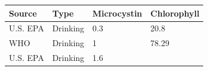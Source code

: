 \documentclass[11pt,]{article}
\begin{document}
\begin{longtable}[c]{@{}llll@{}}
\toprule
\begin{minipage}[b]{0.11\columnwidth}\raggedright\strut
Source
\strut\end{minipage} &
\begin{minipage}[b]{0.16\columnwidth}\raggedright\strut
Type
\strut\end{minipage} &
\begin{minipage}[b]{0.17\columnwidth}\raggedright\strut
Microcystin
\strut\end{minipage} &
\begin{minipage}[b]{0.17\columnwidth}\raggedright\strut
Chlorophyll
\strut\end{minipage}\tabularnewline
\midrule
\endhead
\begin{minipage}[t]{0.11\columnwidth}\raggedright\strut
U.S. EPA
\strut\end{minipage} &
\begin{minipage}[t]{0.16\columnwidth}\raggedright\strut
Drinking
\strut\end{minipage} &
\begin{minipage}[t]{0.17\columnwidth}\raggedright\strut
0.3
\strut\end{minipage} &
\begin{minipage}[t]{0.17\columnwidth}\raggedright\strut
20.8
\strut\end{minipage}\tabularnewline
\begin{minipage}[t]{0.11\columnwidth}\raggedright\strut
WHO
\strut\end{minipage} &
\begin{minipage}[t]{0.16\columnwidth}\raggedright\strut
Drinking
\strut\end{minipage} &
\begin{minipage}[t]{0.17\columnwidth}\raggedright\strut
1
\strut\end{minipage} &
\begin{minipage}[t]{0.17\columnwidth}\raggedright\strut
78.29
\strut\end{minipage}\tabularnewline
\begin{minipage}[t]{0.11\columnwidth}\raggedright\strut
U.S. EPA
\strut\end{minipage} &
\begin{minipage}[t]{0.16\columnwidth}\raggedright\strut
Drinking
\strut\end{minipage} &
\begin{minipage}[t]{0.17\columnwidth}\raggedright\strut
1.6
\strut\end{minipage} &

\end{longtable}
\end{document}
